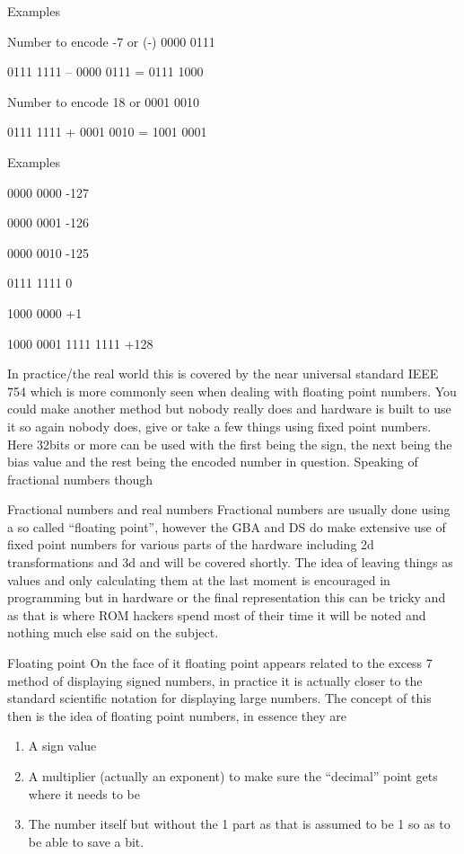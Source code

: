\documentclass[
]{book}
\providecommand{\tightlist}{%
  \setlength{\itemsep}{0pt}\setlength{\parskip}{0pt}}
\begin{document}
Examples

Number to encode -7 or (-) 0000 0111

0111 1111 -- 0000 0111 = 0111 1000

Number to encode 18 or 0001 0010

0111 1111 + 0001 0010 = 1001 0001

Examples

0000 0000 -127

0000 0001 -126

0000 0010 -125

0111 1111 0

1000 0000 +1

1000 0001 1111 1111 +128

In practice/the real world this is covered by the near universal standard IEEE 754 which is more commonly seen when dealing with floating point numbers. You could make another method but nobody really does and hardware is built to use it so again nobody does, give or take a few things using fixed point numbers. Here 32bits or more can be used with the first being the sign, the next being the bias value and the rest being the encoded number in question. Speaking of fractional numbers though

Fractional numbers and real numbers Fractional numbers are usually done using a so called ``floating point'', however the GBA and DS do make extensive use of fixed point numbers for various parts of the hardware including 2d transformations and 3d and will be covered shortly. The idea of leaving things as values and only calculating them at the last moment is encouraged in programming but in hardware or the final representation this can be tricky and as that is where ROM hackers spend most of their time it will be noted and nothing much else said on the subject.

Floating point On the face of it floating point appears related to the excess 7 method of displaying signed numbers, in practice it is actually closer to the standard scientific notation for displaying large numbers. The concept of this then is the idea of floating point numbers, in essence they are

\begin{enumerate}
\def\labelenumi{\arabic{enumi}.}
\tightlist
\item
  A sign value
\item
  A multiplier (actually an exponent) to make sure the ``decimal'' point gets where it needs to be
\item
  The number itself but without the 1 part as that is assumed to be 1 so as to be able to save a bit.
\end{enumerate}
\end{document}
